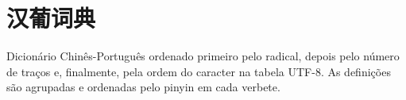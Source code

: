 \documentclass[a4paper,9pt,twoside,openright,book]{memoir}
\begin{document}



\clearpage
\pagestyle{empty}
\twocolumn
\tableofcontents
\onecolumn

\clearpage
\pagestyle{empty}
\chapter{汉葡词典}

%
%

Dicionário Chinês-Português ordenado primeiro pelo radical,
depois pelo número de traços e, finalmente, pela ordem do
caracter na tabela UTF-8.  As definições são agrupadas e
ordenadas pelo pinyin em cada verbete.
\end{document}
